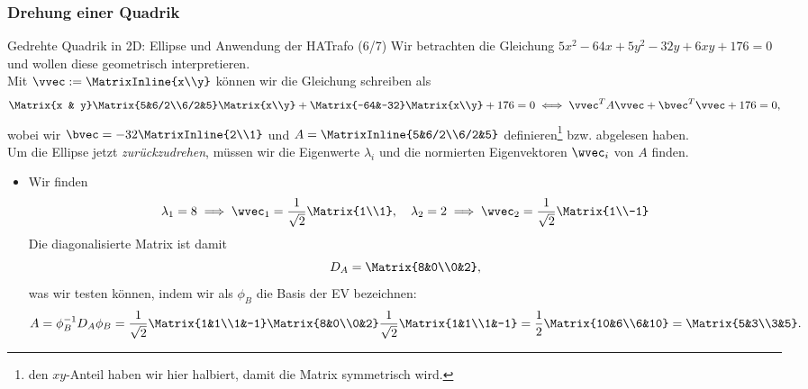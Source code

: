 \subsubsection{Drehung einer Quadrik}
\begin{Beispiel}
{Gedrehte Quadrik in 2D: Ellipse und Anwendung der HATrafo (6/7)}
Wir betrachten die Gleichung $\boxed{5x^2-64x+5y^2-32y+6xy+176=0}$ und wollen diese geometrisch interpretieren.\\
Mit $\vvec:=\MatrixInline{x\\y}$ können wir die Gleichung schreiben als
\begin{equation*}
    \Matrix{x & y}\Matrix{5&6/2\\6/2&5}\Matrix{x\\y}+ \Matrix{-64&-32}\Matrix{x\\y}+176=0\iff \vvec^T A \vvec+ \bvec^T\vvec +176 =0,
\end{equation*}
wobei wir $\bvec=-32\MatrixInline{2\\1}$ und $A=\MatrixInline{5&6/2\\6/2&5}$ definieren\footnote{den $xy$-Anteil haben wir hier halbiert, damit die Matrix symmetrisch wird.} bzw. abgelesen haben.\\
Um die Ellipse jetzt \textit{zurückzudrehen}, müssen wir die Eigenwerte $\lambda_i$ und die normierten Eigenvektoren $\wvec_i$ von $A$ finden.
\begin{itemize}
    \item Wir finden 
    \begin{equation*}
        \lambda_1=8\implies \wvec_1=\frac{1}{\sqrt{2}}\Matrix{1\\1},\quad \lambda_2=2\implies \wvec_2=\frac{1}{\sqrt{2}}\Matrix{1\\-1}
    \end{equation*}
    Die diagonalisierte Matrix ist damit
    \begin{equation*}
        D_A=\Matrix{8&0\\0&2},
    \end{equation*}
    was wir testen können, indem wir als $\phi_B$ die Basis der EV bezeichnen:
    \begin{equation*}
        A=\phi_B^{-1} D_A\phi_B=\frac{1}{\sqrt{2}}\Matrix{1&1\\1&-1}\Matrix{8&0\\0&2}\frac{1}{\sqrt{2}}\Matrix{1&1\\1&-1}=\frac{1}{2}\Matrix{10&6\\6&10}=\Matrix{5&3\\3&5}.

\end{equation*}
\end{itemize}
\end{Beispiel}
